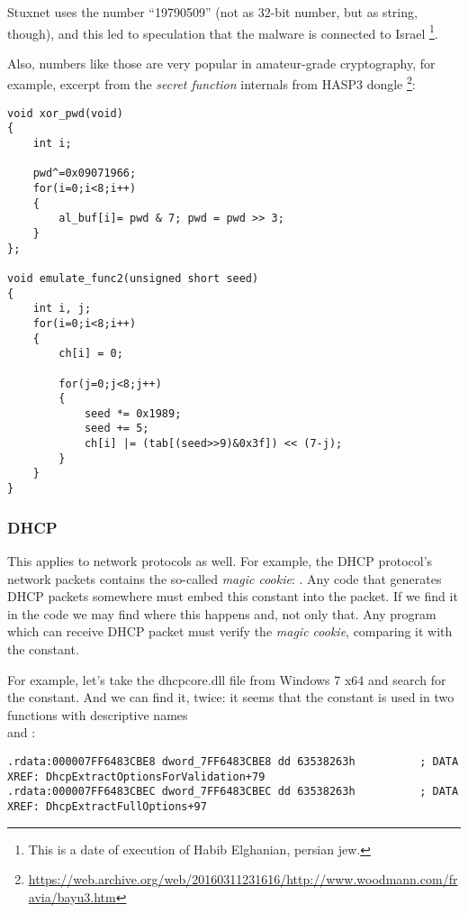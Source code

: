 Stuxnet uses the number ``19790509'' (not as 32-bit number, but as string, though), and this led to speculation
that the malware is connected to Israel%
\footnote{This is a date of execution of Habib Elghanian, persian jew.}.

Also, numbers like those are very popular in amateur-grade cryptography, for example, excerpt from the \emph{secret function} internals from HASP3 dongle
\footnote{\url{https://web.archive.org/web/20160311231616/http://www.woodmann.com/fravia/bayu3.htm}}:

\begin{lstlisting}[style=customc]
void xor_pwd(void) 
{ 
	int i; 
	
	pwd^=0x09071966;
	for(i=0;i<8;i++) 
	{ 
		al_buf[i]= pwd & 7; pwd = pwd >> 3; 
	} 
};

void emulate_func2(unsigned short seed)
{ 
	int i, j; 
	for(i=0;i<8;i++) 
	{ 
		ch[i] = 0; 
		
		for(j=0;j<8;j++)
		{ 
			seed *= 0x1989; 
			seed += 5; 
			ch[i] |= (tab[(seed>>9)&0x3f]) << (7-j); 
		}
	} 
}
\end{lstlisting}

\subsubsection{DHCP}

This applies to network protocols as well.
For example, the DHCP protocol's network packets contains the so-called \emph{magic cookie}: .
Any code that generates DHCP packets somewhere must embed this constant into the packet.
If we find it in the code we may find where this happens and, not only that.
Any program which can receive DHCP packet must verify the \emph{magic cookie}, comparing it with the constant.

For example, let's take the dhcpcore.dll file from Windows 7 x64 and search for the constant.
And we can find it, twice:
it seems that the constant is used in two functions with descriptive names\\
 and :

\begin{lstlisting}[caption=dhcpcore.dll (Windows 7 x64),style=customasmx86]
.rdata:000007FF6483CBE8 dword_7FF6483CBE8 dd 63538263h          ; DATA XREF: DhcpExtractOptionsForValidation+79
.rdata:000007FF6483CBEC dword_7FF6483CBEC dd 63538263h          ; DATA XREF: DhcpExtractFullOptions+97
\end{lstlisting}

